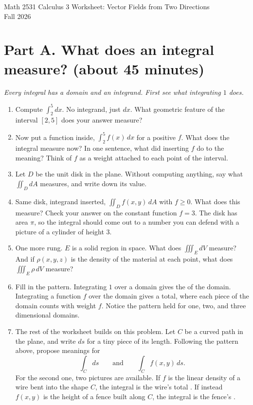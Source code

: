 \documentclass[12pt]{article}
\newcommand{\flow}[1]{\par\noindent\textit{#1}\par\vspace{1mm}}
\begin{document}
\raggedright
\begin{center}
      {\large Math 2531 Calculus 3 Worksheet: Vector Fields from Two Directions}\\
  {Fall 2026}\\
\end{center}

\section*{Part A. What does an integral measure? (about 45 minutes)}

\flow{Every integral has a domain and an integrand. First see what integrating $1$ does.}

\begin{enumerate}
  \item Compute $\displaystyle\int_2^5 dx$. No integrand, just $dx$. What geometric feature of the interval $[2,5]$ does your answer measure?
  \item Now put a function inside, $\displaystyle\int_2^5 f(x)\,dx$ for a positive $f$. What does the integral measure now? In one sentence, what did inserting $f$ do to the meaning? Think of $f$ as a weight attached to each point of the interval.
  \item Let $D$ be the unit disk in the plane. Without computing anything, say what $\displaystyle\iint_D dA$ measures, and write down its value.
  \item Same disk, integrand inserted, $\displaystyle\iint_D f(x,y)\,dA$ with $f \geq 0$. What does this measure? Check your answer on the constant function $f = 3$. The disk has area $\pi$, so the integral should come out to a number you can defend with a picture of a cylinder of height $3$.
  \item One more rung. $E$ is a solid region in space. What does $\displaystyle\iiint_E dV$ measure? And if $\rho(x,y,z)$ is the density of the material at each point, what does $\displaystyle\iiint_E \rho\,dV$ measure?
  \item Fill in the pattern. Integrating $1$ over a domain gives the \underline{\hspace{2cm}} of the domain. Integrating a function $f$ over the domain gives a \underline{\hspace{2cm}} total, where each piece of the domain counts with weight $f$. Notice the pattern held for one, two, and three dimensional domains.
  \item The rest of the worksheet builds on this problem. Let $C$ be a curved path in the plane, and write $ds$ for a tiny piece of its length. Following the pattern above, propose meanings for
  $$\int_C ds \qquad \text{and} \qquad \int_C f(x,y)\,ds.$$
  For the second one, two pictures are available. If $f$ is the linear density of a wire bent into the shape $C$, the integral is the wire's total \underline{\hspace{2cm}}. If instead $f(x,y)$ is the height of a fence built along $C$, the integral is the fence's \underline{\hspace{2cm}}.
\end{enumerate}
\end{document}
